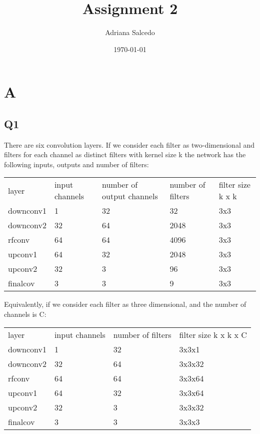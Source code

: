 \documentclass[12pt,letterpaper]{article} %
\title{\Large Assignment 2}
\author{\large Adriana Salcedo}
\date{\large \today}
\begin{document}
\maketitle

\section{A}
\subsection{Q1}

There are six convolution layers. If we consider each filter as two-dimensional and filters for each channel as distinct filters with kernel size k the network has the following inputs, outputs and number of filters:

\begin{table}[]
\begin{tabular}{lllll}
layer     & input channels & number of output channels & number of filters & filter size k x k \\
downconv1 & 1              & 32                        & 32                & 3x3         \\
downconv2 & 32             & 64                        & 2048              & 3x3         \\
rfconv    & 64             & 64                        & 4096              & 3x3         \\
upconv1   & 64             & 32                        & 2048              & 3x3         \\
upconv2   & 32             & 3                         & 96                & 3x3         \\
finalcov  & 3              & 3                         & 9                 & 3x3        
\end{tabular}
\end{table}

Equivalently, if we consider each filter as three dimensional, and the number of channels is C:

\begin{table}[]
\begin{tabular}{llll}
layer     & input channels & number of filters & filter size k x k x C \\
downconv1 & 1              & 32                & 3x3x1                 \\
downconv2 & 32             & 64                & 3x3x32                \\
rfconv    & 64             & 64                & 3x3x64                \\
upconv1   & 64             & 32                & 3x3x64                \\
upconv2   & 32             & 3                 & 3x3x32                \\
finalcov  & 3              & 3                 & 3x3x3                
\end{tabular}
\end{table}
\end{document}
